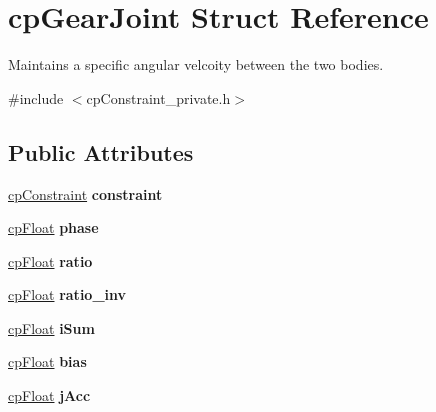 \hypertarget{structcp_gear_joint}{}\section{cp\+Gear\+Joint Struct Reference}
\label{structcp_gear_joint}


Maintains a specific angular velcoity between the two bodies.  




{\ttfamily \#include $<$cp\+Constraint\+\_\+private.\+h$>$}

\subsection*{Public Attributes}
\begin{DoxyCompactItemize}
\item 
\hypertarget{structcp_gear_joint_acb21ac29bbf98409162715a54988564a}{}\hyperlink{structcp_constraint}{cp\+Constraint} {\bfseries constraint}\label{structcp_gear_joint_acb21ac29bbf98409162715a54988564a}

\item 
\hypertarget{structcp_gear_joint_ae255b8761ec6a976ca56a119eaf7fda5}{}\hyperlink{group__basic_types_gac1ed65573e035bf892505768c852d8d3}{cp\+Float} {\bfseries phase}\label{structcp_gear_joint_ae255b8761ec6a976ca56a119eaf7fda5}

\item 
\hypertarget{structcp_gear_joint_a7934797f6b15a2456a1b5dc95ff8f3f6}{}\hyperlink{group__basic_types_gac1ed65573e035bf892505768c852d8d3}{cp\+Float} {\bfseries ratio}\label{structcp_gear_joint_a7934797f6b15a2456a1b5dc95ff8f3f6}

\item 
\hypertarget{structcp_gear_joint_a8ba9f80613eb37c26766e1cfd4fe2d29}{}\hyperlink{group__basic_types_gac1ed65573e035bf892505768c852d8d3}{cp\+Float} {\bfseries ratio\+\_\+inv}\label{structcp_gear_joint_a8ba9f80613eb37c26766e1cfd4fe2d29}

\item 
\hypertarget{structcp_gear_joint_a2b2841e7f22baba0db78dc238d6b3520}{}\hyperlink{group__basic_types_gac1ed65573e035bf892505768c852d8d3}{cp\+Float} {\bfseries i\+Sum}\label{structcp_gear_joint_a2b2841e7f22baba0db78dc238d6b3520}

\item 
\hypertarget{structcp_gear_joint_a457177bdcb71ce3807df116a611bd36e}{}\hyperlink{group__basic_types_gac1ed65573e035bf892505768c852d8d3}{cp\+Float} {\bfseries bias}\label{structcp_gear_joint_a457177bdcb71ce3807df116a611bd36e}

\item 
\hypertarget{structcp_gear_joint_a3910d5240112327dd2a4f5ccc9170cf0}{}\hyperlink{group__basic_types_gac1ed65573e035bf892505768c852d8d3}{cp\+Float} {\bfseries j\+Acc}\label{structcp_gear_joint_a3910d5240112327dd2a4f5ccc9170cf0}

\end{DoxyCompactItemize}


